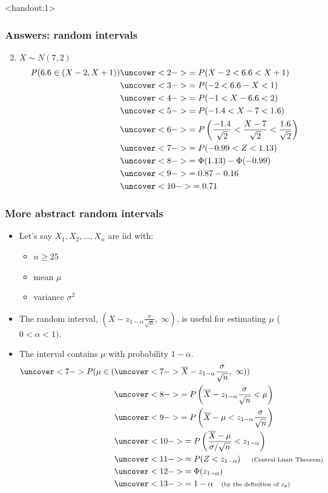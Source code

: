 \documentclass[handout]{beamer}\usepackage[]{graphicx}\usepackage[]{color}
\newcommand{\answers}{1}
\providecommand{\ov}[1]{\overline{#1}}
\numberwithin{equation}{section}
\begin{document}
\begin{frame}<handout:\answers>
\frametitle{Answers: random intervals}
\begin{enumerate}[1. ]
\setcounter{enumi}{1}
\item $X \sim N(7, 2)$
\begin{align*}
P(6.6 \in (X - 2, X + 1)) & \uncover<2->{= P(X - 2 < 6.6 < X + 1)} \\
&\uncover<3->{= P(-2 < 6.6 - X < 1)} \\
&\uncover<4->{ = P(-1 < X - 6.6 < 2)} \\
&\uncover<5->{ = P(-1.4 < X - 7 < 1.6)} \\
&\uncover<6->{=P \left (\frac{-1.4}{\sqrt{2}} < \frac{X - 7}{\sqrt{2}} < \frac{1.6}{\sqrt{2}} \right ) }\\
&\uncover<7->{= P( -0.99 < Z < 1.13)} \\
&\uncover<8->{= \Phi(1.13) - \Phi(-0.99)} \\
&\uncover<9->{= 0.87 - 0.16} \\
&\uncover<10->{= 0.71}
\end{align*}
\end{enumerate}
\end{frame}





\begin{frame}
\frametitle{More abstract random intervals} \scriptsize
\begin{itemize}
\item Let's say $X_1, X_2, \ldots, X_n$ are iid with:
\begin{itemize}
\pause \item $n \ge 25$
\pause \item mean $\mu$
\pause \item variance $\sigma^2$
\end{itemize}
\pause \item The random interval, $(\ov{X} - z_{1-\alpha} \frac{\sigma}{\sqrt{n}}, \  \infty)$, is useful for estimating $\mu$ ($0 < \alpha < 1)$.
\pause \item The interval contains $\mu$ with probability $1 - \alpha$.
\begin{align*}
\uncover<7->{P (\mu \in ( }&\uncover<7->{ \ov{X} - z_{1 - \alpha} \frac{\sigma}{\sqrt{n}}, \ \infty) )} \\
&\uncover<8->{= P \left (\ov{X} - z_{1 - \alpha} \frac{\sigma}{\sqrt{n}} < \mu \right)} \\
&\uncover<9->{= P \left (\ov{X} - \mu <  z_{1 - \alpha}\frac{\sigma}{\sqrt{n}} \right )} \\
&\uncover<10->{= P \left ( \frac{\ov{X} - \mu}{\sigma/\sqrt{n}} < z_{1 - \alpha} \right )} \\
&\uncover<11->{\approx P( Z < z_{1 - \alpha}) \quad \text{ \scriptsize (Central Limit Theorem)} } \\
&\uncover<12->{= \Phi(z_{1 - \alpha})} \\
&\uncover<13->{= 1 - \alpha \quad \text{\scriptsize (by the definition of $z_p$)}}
\end{align*}
\end{itemize}
\end{frame}
\end{document}
